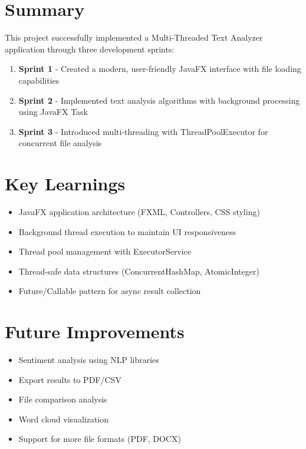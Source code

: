 \documentclass[12pt,a4paper]{report}
\begin{document}
\section{Summary}
This project successfully implemented a Multi-Threaded Text Analyzer application through three development sprints:

\begin{enumerate}
    \item \textbf{Sprint 1} - Created a modern, user-friendly JavaFX interface with file loading capabilities
    \item \textbf{Sprint 2} - Implemented text analysis algorithms with background processing using JavaFX Task
    \item \textbf{Sprint 3} - Introduced multi-threading with ThreadPoolExecutor for concurrent file analysis
\end{enumerate}

\section{Key Learnings}
\begin{itemize}
    \item JavaFX application architecture (FXML, Controllers, CSS styling)
    \item Background thread execution to maintain UI responsiveness
    \item Thread pool management with ExecutorService
    \item Thread-safe data structures (ConcurrentHashMap, AtomicInteger)
    \item Future/Callable pattern for async result collection
\end{itemize}

\section{Future Improvements}
\begin{itemize}
    \item Sentiment analysis using NLP libraries
    \item Export results to PDF/CSV
    \item File comparison analysis
    \item Word cloud visualization
    \item Support for more file formats (PDF, DOCX)
\end{itemize}

\appendix
\end{document}
